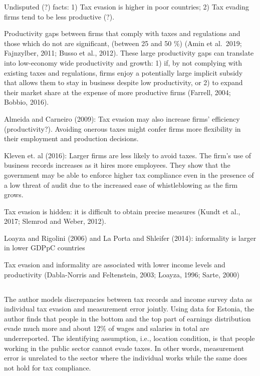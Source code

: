 \documentclass[
  12pt]{article}
\theoremstyle{definition}
\theoremstyle{remark}
\begin{document}
Undisputed (?) facts: 1) Tax evasion is higher in poor countries; 2) Tax
evading firms tend to be less productive (?).

Productivity gaps between firms that comply with taxes and regulations
and those which do not are significant, (between 25 and 50 \%) (Amin et
al.~2019; Fajnzylber, 2011; Busso et al., 2012). These large
productivity gaps can translate into low-economy wide productivity and
growth: 1) if, by not complying with existing taxes and regulations,
firms enjoy a potentially large implicit subsidy that allows them to
stay in business despite low productivity, or 2) to expand their market
share at the expense of more productive firms (Farrell, 2004; Bobbio,
2016).

Almeida and Carneiro (2009): Tax evasion may also increase firms'
efficiency (productivity?). Avoiding onerous taxes might confer firms
more flexibility in their employment and production decisions.

Kleven et. al (2016): Larger firms are less likely to avoid taxes. The
firm's use of business records increases as it hires more employees.
They show that the government may be able to enforce higher tax
compliance even in the presence of a low threat of audit due to the
increased ease of whistleblowing as the firm grows.

Tax evasion is hidden: it is difficult to obtain precise measures (Kundt
et al., 2017; Slemrod and Weber, 2012).

Loayza and Rigolini (2006) and La Porta and Shleifer (2014): informality
is larger in lower GDPpC countries

Tax evasion and informality are associated with lower income levels and
productivity (Dabla-Norris and Feltenstein, 2003; Loayza, 1996; Sarte,
2000)

\subsection{\texorpdfstring{\citet{Paulus2015}}{@Paulus2015}}\label{paulus2015}

The author models discrepancies between tax records and income survey
data as individual tax evasion and measurement error jointly. Using data
for Estonia, the author finds that people in the bottom and the top part
of earnings distribution evade much more and about 12\% of wages and
salaries in total are underreported. The identifying assumption, i.e.,
location condition, is that people working in the public sector cannot
evade taxes. In other words, measurement error is unrelated to the
sector where the individual works while the same does not hold for tax
compliance.
\end{document}
